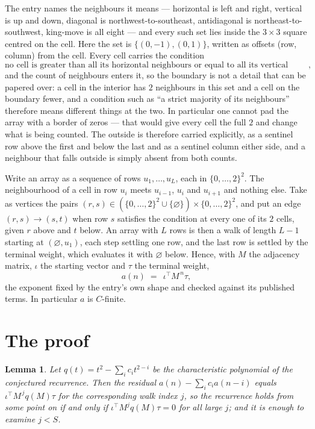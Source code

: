 \documentclass[11pt,a4paper]{article}
\theoremstyle{plain}
\newtheorem{lemma}[theorem]{Lemma}
\theoremstyle{definition}
\begin{document}
The entry names the neighbours it means --- horizontal is left and right, vertical is up and
down, diagonal is northwest-to-southeast, antidiagonal is northeast-to-southwest, king-move is
all eight --- and every such set lies inside the $3\times3$ square centred on the cell. Here
the set is $\{(0,-1), (0,1)\}$, written as offsets (row, column) from the cell. Every cell carries
the condition
\[
\text{no cell is greater than all its horizontal neighbours or equal to all its vertical neighbours},
\]
and the count of neighbours enters it, so the boundary is not a detail that can be papered
over: a cell in the interior has $2$ neighbours in this set and a cell on the boundary
fewer, and a condition such as ``a strict majority of its neighbours'' therefore means
different things at the two. In particular one cannot pad the array with a border of zeros ---
that would give every cell the full $2$ and change what is being counted. The outside is
therefore carried
explicitly, as a sentinel row above the first and below the last and as a sentinel column
either side, and a neighbour that falls outside is simply absent from both counts.

Write an array as a sequence of rows $u_1,\dots,u_L$, each in
$\{0,\dots,2\}^{2}$. The neighbourhood of a cell in row $u_i$ meets $u_{i-1}$,
$u_i$ and $u_{i+1}$ and nothing else. Take as vertices the pairs
$(r,s)\in(\{0,\dots,2\}^{2}\cup\{\varnothing\})\times\{0,\dots,2\}^{2}$,
and put an edge $(r,s)\to(s,t)$ when row $s$ satisfies the condition at every one of its
$2$ cells, given $r$ above and $t$ below. An array with $L$ rows is then a walk of length
$L-1$ starting at $(\varnothing,u_1)$, each step settling one row, and the last row is
settled by the terminal weight, which evaluates it with $\varnothing$ below. Hence,
with $M$ the adjacency matrix, $\iota$ the starting vector and $\tau$ the terminal weight,
\[
a(n)\;=\;\,\iota^{\!\top}M^{\,n}\tau ,
\]
the exponent fixed by the entry's own shape and checked against its published terms. In
particular $a$ is $C$-finite.

\section{The proof}

\begin{lemma}\label{lem:crit}
Let $q(t)=t^{2}-\sum_i c_it^{2-i}$ be the characteristic polynomial of the
conjectured recurrence. Then the residual $a(n)-\sum_ic_ia(n-i)$ equals
$\iota^{\!\top}M^{\,j}q(M)\tau$ for the corresponding walk index $j$, so the
recurrence holds from some point on if and only if $\iota^{\!\top}M^{j}q(M)\tau=0$ for all
large $j$; and it is enough to examine $j<S$.
\end{lemma}
\end{document}
